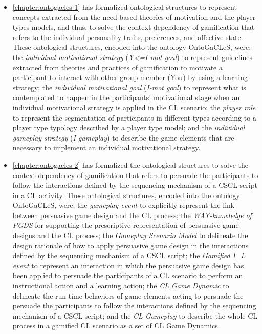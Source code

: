 \begin{itemize}
\item
\autoref{chapter:ontogacles-1} has formalized ontological structures to represent concepts extracted from the need-based theories of motivation and the player types models, and thus, to solve the context-dependency of gamification that refers to the individual personality traits, preferences, and affective state.
These ontological structures, encoded into the ontology OntoGaCLeS, were:
the \emph{individual motivational strategy} (\emph{Y<=I-mot goal}) to represent guidelines extracted from theories and practices of gamification to motivate a participant to interact with other group member (You) by using a learning strategy;
the \emph{individual motivational goal} (\emph{I-mot goal}) to represent what is contemplated to happen in the participants' motivational stage when an individual motivational strategy is applied in the CL scenario;
the \emph{player role} to represent the segmentation of participants in different types according to a player type typology described by a player type model; and
the \emph{individual gameplay strategy} (\emph{I-gameplay}) to describe the game elements that are necessary to implement an individual motivational strategy.

\item
\autoref{chapter:ontogacles-2} has formalized the ontological structures to solve the context-dependency of gamification that refers to persuade the participants to follow the interactions defined by the sequencing mechanism of a CSCL script in a CL activity.
These ontological structures, encoded into the ontology OntoGaCLeS, were:
the \emph{gameplay event} to explicitly represent the link between persuasive game design and the CL process;
the \emph{WAY-knowledge of PGDS} for supporting the prescriptive representation of persuasive game designs and the CL process;
the \emph{Gameplay Scenario Model} to delineate the design rationale of how to apply persuasive game design in the interactions defined by the sequencing mechanism of a CSCL script;
the \emph{Gamified I\_L event} to represent an interaction in which the persuasive game design has been applied to persuade the participants of a CL scenario to perform an instructional action and a learning action;
the \emph{CL Game Dynamic} to delineate the run-time behaviors of game elements acting to persuade the persuade the participants to follow the interactions defined by the sequencing mechanism of a CSCL script; and
the \emph{CL Gameplay} to describe the whole CL process in a gamified CL scenario as a set of CL Game Dynamics.
\end{itemize}


